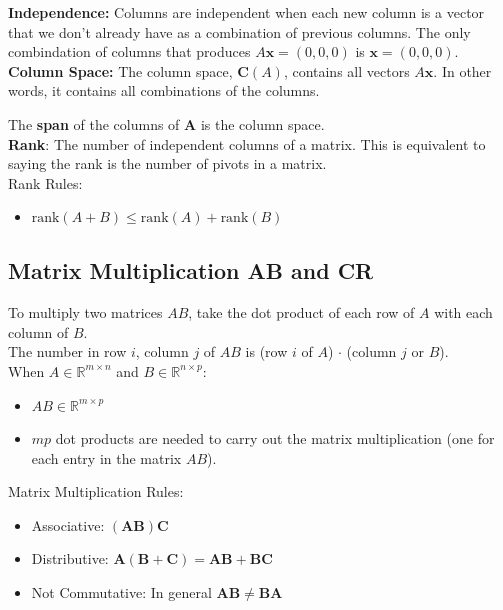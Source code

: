 \documentclass[11pt]{article}
\begin{document}
\textbf{Independence:} Columns are independent when each new column is a vector that we don't
already have as a combination of previous columns. The only combindation of columns that produces
$A\boldsymbol{x} = (0,0,0) $ is $ \boldsymbol{x} = (0, 0, 0) $. \\

\textbf{Column Space:} The column space, $\textbf{C}(A)$, contains all vectors 
$A\boldsymbol{x}$. In other words, it contains all combinations of the columns.

The \textbf{span} of the columns of $\boldsymbol{A}$ is the column space. \\

\textbf{Rank}: The number of independent columns of a matrix. This is equivalent to saying the
rank is the number of pivots in a matrix. \\

Rank Rules:
\begin{itemize}
    \item $ \text{rank}(A + B) \le \text{rank}(A) + \text{rank}(B) $
\end{itemize}

\subsection{Matrix Multiplication AB and CR}

To multiply two matrices $AB$, take the dot product of each row of $A$ with each column of $B$. \\ 
The number in row $i$, column $j$ of $AB$ is (row $i$ of $A$) $\cdot$ (column $j$ or $B$). \\

When $A \in \mathbb{R}^{m \times n}$ and $B \in \mathbb{R}^{n \times p}$:
\begin{itemize}
    \item  $AB \in \mathbb{R}^{m \times p}$
    \item $mp$ dot products are needed to carry out the matrix multiplication (one for each 
    entry in the matrix $AB$).
\end{itemize}

Matrix Multiplication Rules:
\begin{itemize}
    \item Associative: $(\boldsymbol{AB}) \boldsymbol{C}$
    \item Distributive: $\boldsymbol{A}(\boldsymbol{B} + \boldsymbol{C}) = \boldsymbol{AB} +
    \boldsymbol{BC}$
    \item Not Commutative: In general $\boldsymbol{AB} \ne \boldsymbol{BA}$
\end{itemize}
\end{document}
